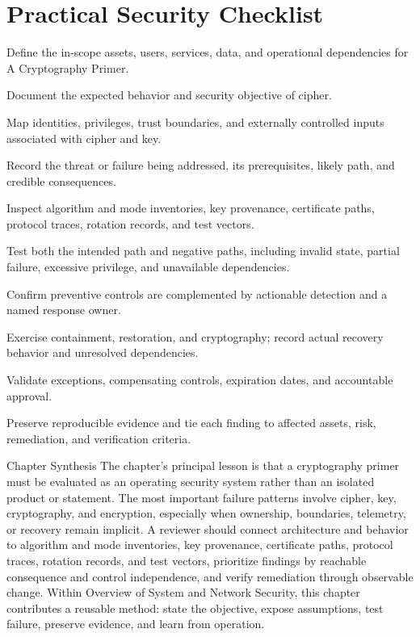 \documentclass[11pt,letterpaper]{article}
\begin{document}
\section*{Practical Security Checklist}
\begin{CornellChecklist}
\item Define the in-scope assets, users, services, data, and operational dependencies for A Cryptography Primer.
\item Document the expected behavior and security objective of cipher.
\item Map identities, privileges, trust boundaries, and externally controlled inputs associated with cipher and key.
\item Record the threat or failure being addressed, its prerequisites, likely path, and credible consequences.
\item Inspect algorithm and mode inventories, key provenance, certificate paths, protocol traces, rotation records, and test vectors.
\item Test both the intended path and negative paths, including invalid state, partial failure, excessive privilege, and unavailable dependencies.
\item Confirm preventive controls are complemented by actionable detection and a named response owner.
\item Exercise containment, restoration, and cryptography; record actual recovery behavior and unresolved dependencies.
\item Validate exceptions, compensating controls, expiration dates, and accountable approval.
\item Preserve reproducible evidence and tie each finding to affected assets, risk, remediation, and verification criteria.
\end{CornellChecklist}
\begin{CornellSummaryBox}{Chapter Synthesis}
The chapter's principal lesson is that a cryptography primer must be evaluated as an operating security system rather than an isolated product or statement. The most important failure patterns involve cipher, key, cryptography, and encryption, especially when ownership, boundaries, telemetry, or recovery remain implicit. A reviewer should connect architecture and behavior to algorithm and mode inventories, key provenance, certificate paths, protocol traces, rotation records, and test vectors, prioritize findings by reachable consequence and control independence, and verify remediation through observable change. Within Overview of System and Network Security, this chapter contributes a reusable method: state the objective, expose assumptions, test failure, preserve evidence, and learn from operation.
\end{CornellSummaryBox}
\end{document}
